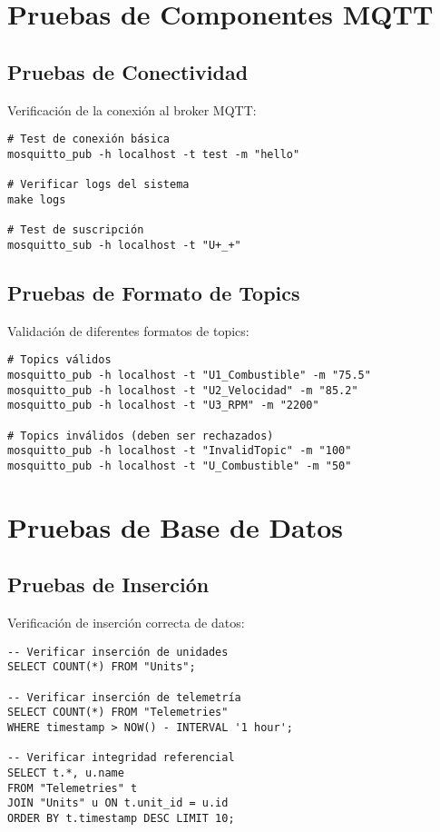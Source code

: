 
\section{Pruebas de Componentes MQTT}

\subsection{Pruebas de Conectividad}

Verificación de la conexión al broker MQTT:

\begin{verbatim}
# Test de conexión básica
mosquitto_pub -h localhost -t test -m "hello"

# Verificar logs del sistema
make logs

# Test de suscripción
mosquitto_sub -h localhost -t "U+_+"
\end{verbatim}

\subsection{Pruebas de Formato de Topics}

Validación de diferentes formatos de topics:

\begin{verbatim}
# Topics válidos
mosquitto_pub -h localhost -t "U1_Combustible" -m "75.5"
mosquitto_pub -h localhost -t "U2_Velocidad" -m "85.2"
mosquitto_pub -h localhost -t "U3_RPM" -m "2200"

# Topics inválidos (deben ser rechazados)
mosquitto_pub -h localhost -t "InvalidTopic" -m "100"
mosquitto_pub -h localhost -t "U_Combustible" -m "50"
\end{verbatim}

\section{Pruebas de Base de Datos}

\subsection{Pruebas de Inserción}

Verificación de inserción correcta de datos:

\begin{verbatim}
-- Verificar inserción de unidades
SELECT COUNT(*) FROM "Units";

-- Verificar inserción de telemetría
SELECT COUNT(*) FROM "Telemetries" 
WHERE timestamp > NOW() - INTERVAL '1 hour';

-- Verificar integridad referencial
SELECT t.*, u.name 
FROM "Telemetries" t 
JOIN "Units" u ON t.unit_id = u.id 
ORDER BY t.timestamp DESC LIMIT 10;
\end{verbatim}


